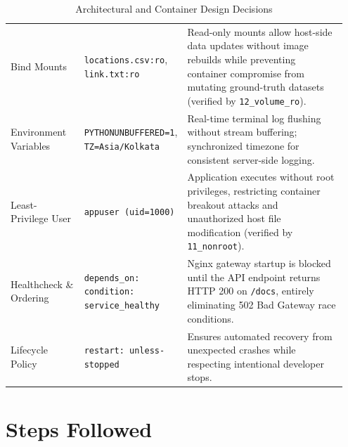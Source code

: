 \documentclass[10pt,a4paper]{article}
\begin{document}
\begin{table}[H]
\begin{tabular}{p{0.22\linewidth} p{0.24\linewidth} p{0.49\linewidth}}
\addlinespace
Bind Mounts & \texttt{locations.csv:ro}, \texttt{link.txt:ro} & Read-only mounts allow host-side data updates without image rebuilds while preventing container compromise from mutating ground-truth datasets (verified by \texttt{12\_volume\_ro}). \\
\addlinespace
Environment Variables & \texttt{PYTHONUNBUFFERED=1}, \texttt{TZ=Asia/Kolkata} & Real-time terminal log flushing without stream buffering; synchronized timezone for consistent server-side logging. \\
\addlinespace
Least-Privilege User & \texttt{appuser (uid=1000)} & Application executes without root privileges, restricting container breakout attacks and unauthorized host file modification (verified by \texttt{11\_nonroot}). \\
\addlinespace
Healthcheck \& Ordering & \texttt{depends\_on: condition: service\_healthy} & Nginx gateway startup is blocked until the API endpoint returns HTTP 200 on \texttt{/docs}, entirely eliminating 502 Bad Gateway race conditions. \\
\addlinespace
Lifecycle Policy & \texttt{restart: unless-stopped} & Ensures automated recovery from unexpected crashes while respecting intentional developer stops. \\
\bottomrule
\end{tabular}
\caption{Architectural and Container Design Decisions}
\end{table}

\section{Steps Followed}
\end{document}
